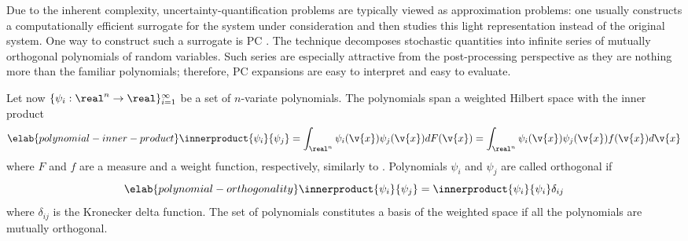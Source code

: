 Due to the inherent complexity, uncertainty-quantification problems are
typically viewed as approximation problems: one usually constructs a
computationally efficient surrogate for the system under consideration and then
studies this light representation instead of the original system. One way to
construct such a surrogate is \ac{PC} \cite{xiu2010}. The technique decomposes
stochastic quantities into infinite series of mutually orthogonal polynomials of
random variables. Such series are especially attractive from the post-processing
perspective as they are nothing more than the familiar polynomials; therefore,
\ac{PC} expansions are easy to interpret and easy to evaluate.

Let now $\{ \psi_i: \real^n \to \real \}_{i = 1}^\infty$ be a set of $n$-variate
polynomials. The polynomials span a weighted Hilbert space with the inner
product
\begin{equation} \elab{polynomial-inner-product}
  \innerproduct{\psi_i}{\psi_j}
  = \int_{\real^n} \psi_i(\v{x}) \psi_j(\v{x}) dF(\v{x})
  = \int_{\real^n} \psi_i(\v{x}) \psi_j(\v{x}) f(\v{x}) d\v{x}
\end{equation}
where $F$ and $f$ are a measure and a weight function, respectively, similarly
to . Polynomials $\psi_i$ and $\psi_j$ are called
orthogonal if
\begin{equation} \elab{polynomial-orthogonality}
  \innerproduct{\psi_i}{\psi_j} = \innerproduct{\psi_i}{\psi_i} \delta_{ij}
\end{equation}
where $\delta_{ij}$ is the Kronecker delta function. The set of polynomials
constitutes a basis of the weighted space if all the polynomials are mutually
orthogonal.

